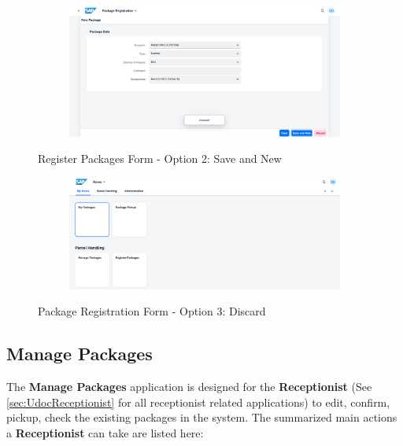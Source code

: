 \begin{figure}[htb!]
	\centering
    \begin{subfigure}{1\linewidth}
        \centering
        \includegraphics[width=1\linewidth]{images/user_doc/registration/saveAndNewToast.png}
    \end{subfigure}
    \caption{Register Packages Form - Option 2: Save and New}
    \label{fig:RPsaveNewOp}
\end{figure}

\begin{figure}[H]
	\centering
    \begin{subfigure}{1\linewidth}
        \centering
        \includegraphics[width=1\linewidth]{images/user_doc/registration/discardTarget.png}
    \end{subfigure}
    \caption{Package Registration Form - Option 3: Discard}
    \label{fig:RPdiscardOp}
\end{figure}

\bigskip
\subsection{Manage Packages}                     
\label{subsec:mp}

The \textbf{Manage Packages} application is designed for the \textbf{Receptionist} (See \autoref{sec:UdocReceptionist} for all receptionist related applications) to edit, confirm, pickup, check the existing packages in the system. The summarized main actions a \textbf{Receptionist} can take are listed here:

